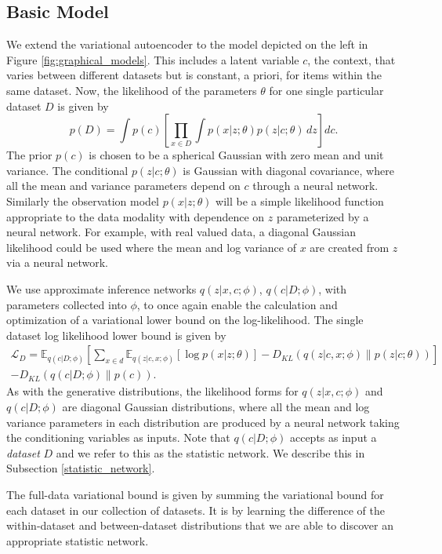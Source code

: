\documentclass{article} %
\newcommand{\KL}[2]{D_{KL} \left (#1 \| #2 \right )}
\begin{document}
\subsection{Basic Model}
We extend the variational autoencoder to the model depicted on the left in Figure \ref{fig:graphical_models}. This includes a latent variable $c$, the context, that varies between different datasets but is constant, a priori, for items within the same dataset. Now, the likelihood of the parameters $\theta$ for one single particular dataset $D$ is given by
\begin{equation}
    p(D) = \int p(c) \left [ \prod_{x \in D} \int p(x|z; \theta) p(z | c ; \theta) \, dz \right ] dc.
\end{equation}
The prior $p(c)$ is chosen to be a spherical Gaussian with zero mean and unit variance. The conditional $p(z | c ; \theta)$ is Gaussian with diagonal covariance, where all the mean and variance parameters depend on $c$ through a neural network. Similarly the observation model $p(x|z;\theta)$ will be a simple likelihood function appropriate to the data modality with dependence on $z$ parameterized by a neural network. For example, with real valued data, a diagonal Gaussian likelihood could be used where the mean and log variance of $x$ are created from $z$ via a neural network.

We use approximate inference networks $q(z |x, c;\phi)$, $q(c | D ; \phi)$, with parameters collected into $\phi$, to once again enable the calculation and optimization of a variational lower bound on the log-likelihood. The single dataset log likelihood lower bound is given by
\begin{multline}
      \mathcal{L}_D = \mathbb{E}_{q(c | D;\phi)} \left [ \sum_{x \in d} \mathbb{E}_{q(z|c,x ;\phi)} \left [  \log p(x|z ;\theta) \right ]  -\KL{q(z | c,x ;\phi)}{p(z | c ; \theta)} \right ]  \\ - \KL{q(c | D ; \phi)}{p(c)}.
\end{multline}
As with the generative distributions, the likelihood forms for $q(z |x, c;\phi)$ and $q(c | D ; \phi)$ are diagonal Gaussian distributions, where all the mean and log variance parameters in each distribution are produced by a neural network taking the conditioning variables as inputs. Note that $q(c | D; \phi)$ accepts as input a \emph{dataset} $D$ and we refer to this as the statistic network. We describe this in Subsection \ref{statistic_network}. 

The full-data variational bound is given by summing the variational bound for each dataset in our collection of datasets. It is by learning the difference of the within-dataset and between-dataset distributions that we are able to discover an appropriate statistic network.
\end{document}
